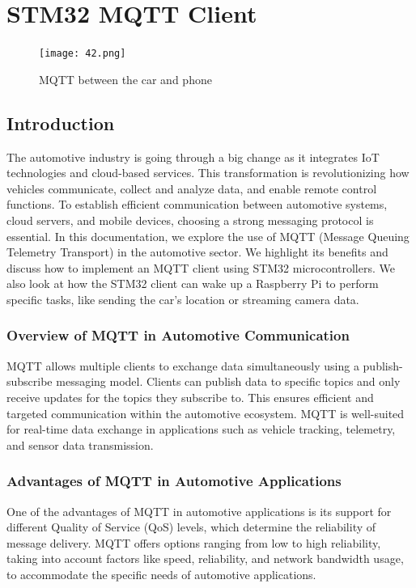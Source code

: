 \documentclass[
12pt,
oneside, 
onehalfspacing, 
nolistspacing, 
parskip, 
chapterinoneline, 
]{AASTCOMPUTER}
\begin{document}
\chapter{STM32 MQTT Client}
\begin{figure}[!ht]
\centering
\texttt{[image: 42.png]}
\caption[MQTT between the car and phone]{MQTT between the car and phone}
\label{fig:TCU}
\end{figure}
\section{Introduction}
The automotive industry is going through a big change as it integrates IoT technologies and cloud-based services. This transformation is revolutionizing how vehicles communicate, collect and analyze data, and enable remote control functions. To establish efficient communication between automotive systems, cloud servers, and mobile devices, choosing a strong messaging protocol is essential. In this documentation, we explore the use of MQTT (Message Queuing Telemetry Transport) in the automotive sector. We highlight its benefits and discuss how to implement an MQTT client using STM32 microcontrollers. We also look at how the STM32 client can wake up a Raspberry Pi to perform specific tasks, like sending the car's location or streaming camera data.

\subsection{Overview of MQTT in Automotive Communication}
MQTT allows multiple clients to exchange data simultaneously using a publish-subscribe messaging model. Clients can publish data to specific topics and only receive updates for the topics they subscribe to. This ensures efficient and targeted communication within the automotive ecosystem. MQTT is well-suited for real-time data exchange in applications such as vehicle tracking, telemetry, and sensor data transmission.

\subsection{Advantages of MQTT in Automotive Applications}
One of the advantages of MQTT in automotive applications is its support for different Quality of Service (QoS) levels, which determine the reliability of message delivery. MQTT offers options ranging from low to high reliability, taking into account factors like speed, reliability, and network bandwidth usage, to accommodate the specific needs of automotive applications.
\end{document}
